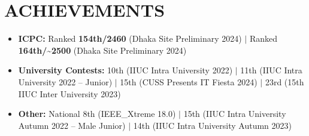 \documentclass[10pt]{article} %
\newenvironment{rSection}[1]{
  \section*{#1}
}{
  \vspace{-5pt}
}
\begin{document}
\vspace{10pt}


\begin{rSection}{ACHIEVEMENTS}
\vspace{10pt}

\begin{itemize}[label=$\bullet$, itemsep=4pt, parsep=0pt, leftmargin=15pt]
    \item \textbf{ICPC:} Ranked \textbf{154th/2460} (Dhaka Site Preliminary 2024) $|$ Ranked \textbf{164th/\textasciitilde2500} (Dhaka Site Preliminary 2024)
    \item \textbf{University Contests:} 10th (IIUC Intra University 2022) $|$ 11th (IIUC Intra University 2022 -- Junior) $|$ 15th (CUSS Presents IT Fiesta 2024) $|$ 23rd (15th IIUC Inter University 2023)
    \item \textbf{Other:} National 8th (IEEE\_Xtreme 18.0) $|$ 15th (IIUC Intra University Autumn 2022 -- Male Junior) $|$ 14th (IIUC Intra University Autumn 2023)
\end{itemize}

\end{rSection}
\end{document}
